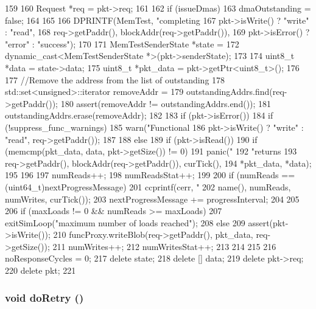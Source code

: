 \begin{DoxyCode}
159 {
160     Request *req = pkt->req;
161 
162     if (issueDmas) {
163         dmaOutstanding = false;
164     }
165 
166     DPRINTF(MemTest, "completing %
167             pkt->isWrite() ? "write" : "read",
168             req->getPaddr(), blockAddr(req->getPaddr()),
169             pkt->isError() ? "error" : "success");
170 
171     MemTestSenderState *state =
172         dynamic_cast<MemTestSenderState *>(pkt->senderState);
173 
174     uint8_t *data = state->data;
175     uint8_t *pkt_data = pkt->getPtr<uint8_t>();
176 
177     //Remove the address from the list of outstanding
178     std::set<unsigned>::iterator removeAddr =
179         outstandingAddrs.find(req->getPaddr());
180     assert(removeAddr != outstandingAddrs.end());
181     outstandingAddrs.erase(removeAddr);
182 
183     if (pkt->isError()) {
184         if (!suppress_func_warnings) {
185           warn("Functional %
186                pkt->isWrite() ? "write" : "read", req->getPaddr());
187         }
188     } else {
189         if (pkt->isRead()) {
190             if (memcmp(pkt_data, data, pkt->getSize()) != 0) {
191                 panic("%
192                       "returns %
193                       req->getPaddr(), blockAddr(req->getPaddr()), curTick(),
194                       *pkt_data, *data);
195             }
196 
197             numReads++;
198             numReadsStat++;
199 
200             if (numReads == (uint64_t)nextProgressMessage) {
201                 ccprintf(cerr, "%
202                          name(), numReads, numWrites, curTick());
203                 nextProgressMessage += progressInterval;
204             }
205 
206             if (maxLoads != 0 && numReads >= maxLoads)
207                 exitSimLoop("maximum number of loads reached");
208         } else {
209             assert(pkt->isWrite());
210             funcProxy.writeBlob(req->getPaddr(), pkt_data, req->getSize());
211             numWrites++;
212             numWritesStat++;
213         }
214     }
215 
216     noResponseCycles = 0;
217     delete state;
218     delete [] data;
219     delete pkt->req;
220     delete pkt;
221 }
\end{DoxyCode}
\hypertarget{classMemTest_a31440e5510a8c7bfc74e17363d813401}{
\subsubsection[{doRetry}]{\setlength{\rightskip}{0pt plus 5cm}void doRetry ()}}
\label{classMemTest_a31440e5510a8c7bfc74e17363d813401}



